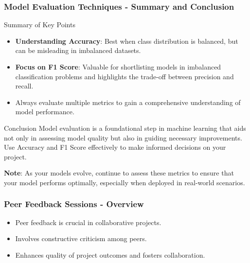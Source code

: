 \documentclass[aspectratio=169]{beamer}
\begin{document}
\begin{frame}[fragile]
    \frametitle{Model Evaluation Techniques - Summary and Conclusion}
    \begin{block}{Summary of Key Points}
        \begin{itemize}
            \item \textbf{Understanding Accuracy}: Best when class distribution is balanced, but can be misleading in imbalanced datasets.
            \item \textbf{Focus on F1 Score}: Valuable for shortlisting models in imbalanced classification problems and highlights the trade-off between precision and recall.
            \item Always evaluate multiple metrics to gain a comprehensive understanding of model performance.
        \end{itemize}
    \end{block}

    \begin{block}{Conclusion}
        Model evaluation is a foundational step in machine learning that aids not only in assessing model quality but also in guiding necessary improvements. Use Accuracy and F1 Score effectively to make informed decisions on your project.

        \textbf{Note}: As your models evolve, continue to assess these metrics to ensure that your model performs optimally, especially when deployed in real-world scenarios.
    \end{block}
\end{frame}

\begin{frame}[fragile]
    \frametitle{Peer Feedback Sessions - Overview}
    \begin{itemize}
        \item Peer feedback is crucial in collaborative projects.
        \item Involves constructive criticism among peers.
        \item Enhances quality of project outcomes and fosters collaboration.
    \end{itemize}
\end{frame}
\end{document}
